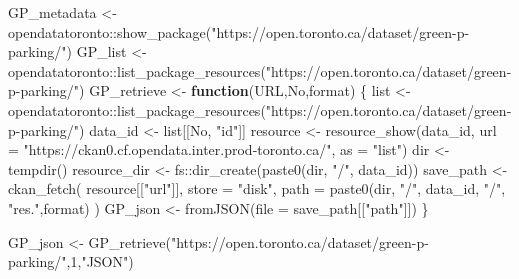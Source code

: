 \documentclass[
]{article}
\newenvironment{Shaded}{\begin{snugshade}}{\end{snugshade}}
\newcommand{\AttributeTok}[1]{\textcolor[rgb]{0.77,0.63,0.00}{#1}}
\newcommand{\ControlFlowTok}[1]{\textcolor[rgb]{0.13,0.29,0.53}{\textbf{#1}}}
\newcommand{\DecValTok}[1]{\textcolor[rgb]{0.00,0.00,0.81}{#1}}
\newcommand{\FunctionTok}[1]{\textcolor[rgb]{0.00,0.00,0.00}{#1}}
\newcommand{\NormalTok}[1]{#1}
\newcommand{\OtherTok}[1]{\textcolor[rgb]{0.56,0.35,0.01}{#1}}
\newcommand{\SpecialCharTok}[1]{\textcolor[rgb]{0.00,0.00,0.00}{#1}}
\newcommand{\StringTok}[1]{\textcolor[rgb]{0.31,0.60,0.02}{#1}}
\begin{document}
\begin{Shaded}
\begin{Highlighting}[]
\NormalTok{GP\_metadata }\OtherTok{\textless{}{-}}\NormalTok{ opendatatoronto}\SpecialCharTok{::}\FunctionTok{show\_package}\NormalTok{(}\StringTok{"https://open.toronto.ca/dataset/green{-}p{-}parking/"}\NormalTok{)}
\NormalTok{GP\_list }\OtherTok{\textless{}{-}}\NormalTok{ opendatatoronto}\SpecialCharTok{::}\FunctionTok{list\_package\_resources}\NormalTok{(}\StringTok{"https://open.toronto.ca/dataset/green{-}p{-}parking/"}\NormalTok{)}
\NormalTok{GP\_retrieve }\OtherTok{\textless{}{-}} \ControlFlowTok{function}\NormalTok{(URL,No,format) \{}
\NormalTok{  list }\OtherTok{\textless{}{-}}\NormalTok{ opendatatoronto}\SpecialCharTok{::}\FunctionTok{list\_package\_resources}\NormalTok{(}\StringTok{"https://open.toronto.ca/dataset/green{-}p{-}parking/"}\NormalTok{)}
\NormalTok{  data\_id }\OtherTok{\textless{}{-}}\NormalTok{ list[[No, }\StringTok{"id"}\NormalTok{]]}
\NormalTok{  resource }\OtherTok{\textless{}{-}}
    \FunctionTok{resource\_show}\NormalTok{(data\_id, }\AttributeTok{url =} \StringTok{"https://ckan0.cf.opendata.inter.prod{-}toronto.ca/"}\NormalTok{, }\AttributeTok{as =} \StringTok{"list"}\NormalTok{)}
\NormalTok{  dir }\OtherTok{\textless{}{-}} \FunctionTok{tempdir}\NormalTok{()}
\NormalTok{  resource\_dir }\OtherTok{\textless{}{-}}\NormalTok{ fs}\SpecialCharTok{::}\FunctionTok{dir\_create}\NormalTok{(}\FunctionTok{paste0}\NormalTok{(dir, }\StringTok{"/"}\NormalTok{, data\_id))}
\NormalTok{  save\_path }\OtherTok{\textless{}{-}}
    \FunctionTok{ckan\_fetch}\NormalTok{(}
\NormalTok{      resource[[}\StringTok{"url"}\NormalTok{]],}
      \AttributeTok{store =} \StringTok{"disk"}\NormalTok{,}
      \AttributeTok{path =} \FunctionTok{paste0}\NormalTok{(dir, }\StringTok{"/"}\NormalTok{, data\_id, }\StringTok{"/"}\NormalTok{, }\StringTok{"res."}\NormalTok{,format)}
\NormalTok{    )}
\NormalTok{  GP\_json }\OtherTok{\textless{}{-}} \FunctionTok{fromJSON}\NormalTok{(}\AttributeTok{file =}\NormalTok{ save\_path[[}\StringTok{"path"}\NormalTok{]])}
\NormalTok{\}}

\NormalTok{GP\_json }\OtherTok{\textless{}{-}} \FunctionTok{GP\_retrieve}\NormalTok{(}\StringTok{"https://open.toronto.ca/dataset/green{-}p{-}parking/"}\NormalTok{,}\DecValTok{1}\NormalTok{,}\StringTok{"JSON"}\NormalTok{)}


\end{Highlighting}
\end{Shaded}
\end{document}
